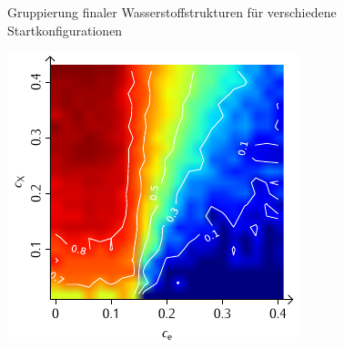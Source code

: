 \documentclass[a4paper, 10pt, twoside, openany]{book} %
\begin{document}
\begin{figure}
\begin{minipage}[t]{0.48\textwidth}
			\label{H_penalty_individual_G}
		\end{minipage}
		\caption[Gruppierung finaler Wasserstoffstrukturen]{Gruppierung finaler Wasserstoffstrukturen für verschiedene Startkonfigurationen}
		\label{H_G}
	\end{figure}
	
	\begin{figure}
		\begin{minipage}[t]{0.48\textwidth}
			\includegraphics[width=\textwidth]{Abbildungen/Phasendiagramme/Konturen/H_cluster_K.pdf}
			\label{H_cluster_K}
		\end{minipage}
		\hfill
		\begin{minipage}[t]{0.48\textwidth}

\end{minipage}
\end{figure}
\end{document}
